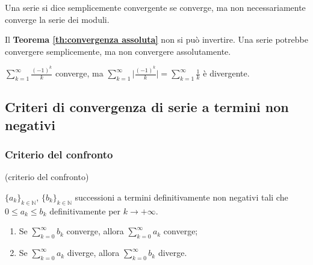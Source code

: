 \begin{definition}
	Una serie si dice semplicemente convergente se converge, ma non necessariamente converge la serie dei moduli.
\end{definition}

\begin{attbar}
	Il \textbf{Teorema \ref{th:convergenza assoluta}} non si può invertire. Una serie potrebbe convergere semplicemente, ma non convergere assolutamente.  
\end{attbar}

\begin{exbar}
	$\sum_{k=1}^\infty \frac{(-1)^k}{k}$ converge, ma $\sum_{k=1}^\infty \bigg| \frac{(-1)^k}{k} \bigg| = \sum_{k=1}^\infty \frac{1}{k}$ è divergente.
\end{exbar}

\subsection{Criteri di convergenza di serie a termini non negativi}
\subsubsection{Criterio del confronto}
\begin{theorem} (criterio del confronto) 
	\label{th:criterio del confronto}
	
	$\{a_k \}_{k\in\mathbb{N}}$, $\{b_k \}_{k\in\mathbb{N}}$ successioni a termini definitivamente non negativi tali che $0\leq a_k \leq b_k$ definitivamente per $k\rightarrow+\infty$.
	
	\begin{enumerate}
		\item Se $\sum_{k=0}^\infty b_k$ converge, allora $\sum_{k=0}^\infty a_k$ converge;
		\item Se $\sum_{k=0}^\infty a_k$ diverge, allora $\sum_{k=0}^\infty b_k$ diverge.
	\end{enumerate}
\end{theorem}

